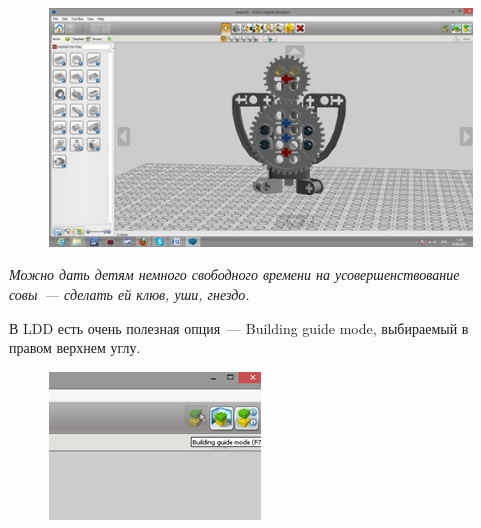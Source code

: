 \begin{enumerate}
\begin{figure}[h!]
\begin{center}
			\includegraphics[width=1\linewidth]{chapters/chapter3/images/21}
			\caption{}
			\label{ris:image3x21}
		\end{center}
	\end{figure}
\end{enumerate}

{\slshape Можно дать детям немного свободного времени на усовершенствование совы~--- сделать ей клюв, уши, гнездо.}

В LDD есть очень полезная опция~--- Building guide mode, выбираемый в правом верхнем углу.
\begin{figure}[h!]
	\begin{center}
		\includegraphics[width=0.75\linewidth]{chapters/chapter3/images/22}
		\caption{}
		\label{ris:image3x22}
	\end{center}
\end{figure}

